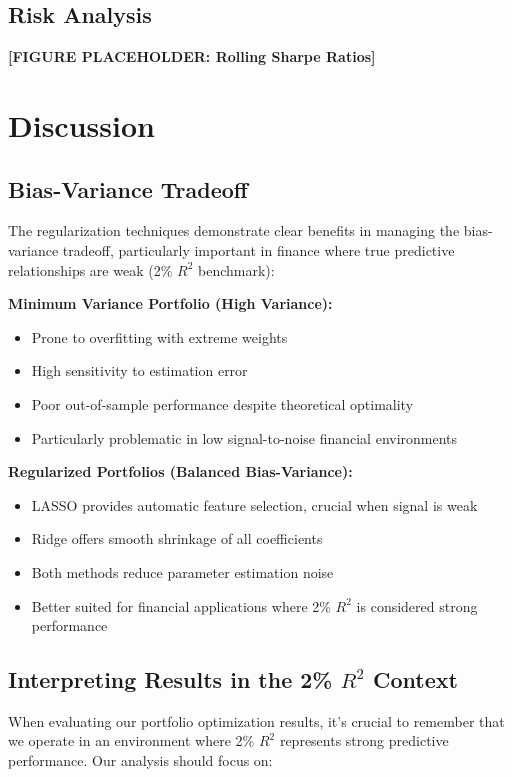 \documentclass[12pt]{article}
\begin{document}
\subsection{Risk Analysis}
\textbf{[FIGURE PLACEHOLDER: Rolling Sharpe Ratios]}
\\

\section{Discussion}

\subsection{Bias-Variance Tradeoff}
The regularization techniques demonstrate clear benefits in managing the bias-variance tradeoff, particularly important in finance where true predictive relationships are weak (2\% $R^2$ benchmark):

\textbf{Minimum Variance Portfolio (High Variance):}
\begin{itemize}
    \item Prone to overfitting with extreme weights
    \item High sensitivity to estimation error
    \item Poor out-of-sample performance despite theoretical optimality
    \item Particularly problematic in low signal-to-noise financial environments
\end{itemize}

\textbf{Regularized Portfolios (Balanced Bias-Variance):}
\begin{itemize}
    \item LASSO provides automatic feature selection, crucial when signal is weak
    \item Ridge offers smooth shrinkage of all coefficients
    \item Both methods reduce parameter estimation noise
    \item Better suited for financial applications where 2\% $R^2$ is considered strong performance
\end{itemize}

\subsection{Interpreting Results in the \texorpdfstring{2\% $R^2$}{2\% R-squared} Context}
When evaluating our portfolio optimization results, it's crucial to remember that we operate in an environment where 2\% $R^2$ represents strong predictive performance. Our analysis should focus on:
\end{document}
